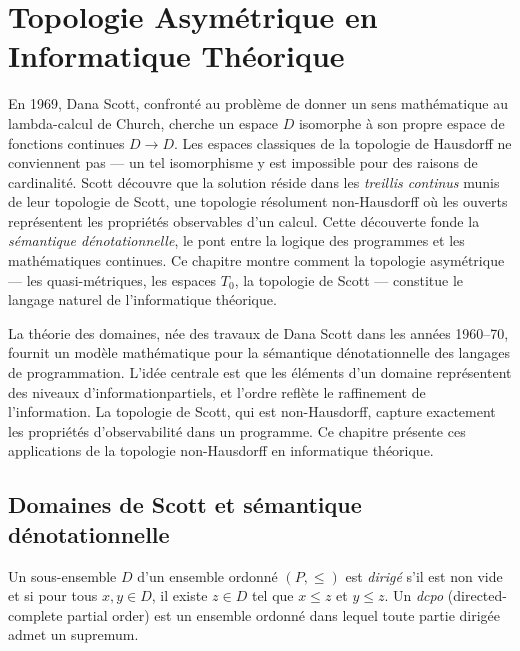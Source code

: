 \chapter{Topologie Asym\'etrique en Informatique Th\'eorique}
\label{ch:informatique}

En 1969, Dana Scott, confront\'e au probl\`eme de donner un sens math\'ematique au lambda-calcul de Church, cherche un espace $D$ isomorphe \`a son propre espace de fonctions continues $D \to D$. Les espaces classiques de la topologie de Hausdorff ne conviennent pas --- un tel isomorphisme y est impossible pour des raisons de cardinalit\'e. Scott d\'ecouvre que la solution r\'eside dans les \emph{treillis continus} munis de leur topologie de Scott, une topologie r\'esolument non-Hausdorff o\`u les ouverts repr\'esentent les propri\'et\'es \og observables \fg{} d'un calcul. Cette d\'ecouverte fonde la \emph{s\'emantique d\'enotationnelle}, le pont entre la logique des programmes et les math\'ematiques continues. Ce chapitre montre comment la topologie asym\'etrique --- les quasi-m\'etriques, les espaces $T_0$, la topologie de Scott --- constitue le langage naturel de l'informatique th\'eorique.

\begin{intuition}
La th\'eorie des domaines, n\'ee des travaux de Dana Scott dans les ann\'ees 1960--70,
fournit un mod\`ele math\'ematique pour la s\'emantique d\'enotationnelle des langages de
programmation. L'id\'ee centrale est que les \'el\'ements d'un domaine repr\'esentent des
\og{}niveaux d'information\fg partiels, et l'ordre refl\`ete le raffinement de
l'information. La topologie de Scott, qui est non-Hausdorff, capture exactement les
propri\'et\'es d'observabilit\'e dans un programme. Ce chapitre pr\'esente ces applications
de la topologie non-Hausdorff en informatique th\'eorique.
\end{intuition}

\section{Domaines de Scott et s\'emantique d\'enotationnelle}

\begin{definition}
Un sous-ensemble $D$ d'un ensemble ordonn\'e $(P, \leq)$ est \emph{dirig\'e} s'il est non
vide et si pour tous $x, y \in D$, il existe $z \in D$ tel que $x \leq z$ et $y \leq z$.
Un \emph{dcpo} (directed-complete partial order) est un ensemble ordonn\'e dans lequel
toute partie dirig\'ee admet un supremum.
\end{definition}

